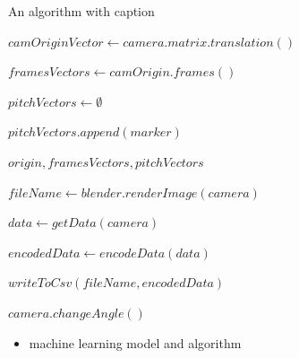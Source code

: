 \documentclass[
11pt,
twoside
]{report}
\begin{document}
\begin{algorithm}
\begin{algorithmic}


\caption{An algorithm with caption}\label{alg:cap}

\State


    \State $camOriginVector \gets camera.matrix.translation()$

    \State $framesVectors \gets camOrigin.frames()$

    \State $pitchVectors \gets \emptyset$

        \State $pitchVectors.append(marker)$
    \EndFor

    \Return $origin, framesVectors, pitchVectors$
\EndProcedure

\State

    \State $fileName \gets blender.renderImage(camera)$

    \State $data \gets getData(camera)$

    \State $encodedData \gets encodeData(data)$

    \State $writeToCsv(fileName, encodedData)$

    \State $camera.changeAngle()$
\EndFor

\State

\end{algorithmic}
\end{algorithm}


\begin{itemize}
\item
  machine learning model and algorithm
\end{itemize}
\end{document}
